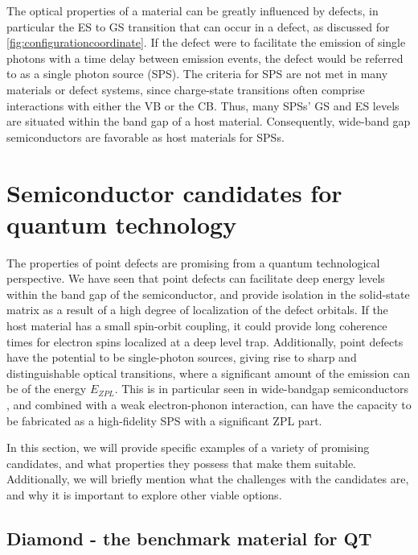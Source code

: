 The optical properties of a material can be greatly influenced by defects, in particular the ES to GS transition that can occur in a defect, as discussed for \autoref{fig:configurationcoordinate}. If the defect were to facilitate the emission of single photons with a time delay between emission events, the defect would be referred to as a single photon source (SPS). The criteria for SPS are not met in many materials or defect systems, since charge-state transitions often comprise interactions with either the VB or the CB. Thus, many SPSs' GS and ES levels are situated within the band gap of a host material. Consequently, wide-band gap semiconductors are favorable as host materials for SPSs.

\section{Semiconductor candidates for quantum technology}

The properties of point defects are promising from a quantum technological perspective. We have seen that point defects can facilitate deep energy levels within the band gap of the semiconductor, and provide isolation in the solid-state matrix as a result of a high degree of localization of the defect orbitals. If the host material has a small spin-orbit coupling, it could provide long coherence times for electron spins localized at a deep level trap. Additionally, point defects have the potential to be single-photon sources, giving rise to sharp and distinguishable optical transitions, where a significant amount of the emission can be of the energy $E_{ZPL}$. This is in particular seen in wide-bandgap semiconductors \cite{Gordon2013, Weber2010}, and combined with a weak electron-phonon interaction, can have the capacity to be fabricated as a high-fidelity SPS with a significant ZPL part.

In this section, we will provide specific examples of a variety of promising candidates, and what properties they possess that make them suitable. Additionally, we will briefly mention what the challenges with the candidates are, and why it is important to explore other viable options.

\subsection{Diamond - the benchmark material for QT}
\label{diamond}



